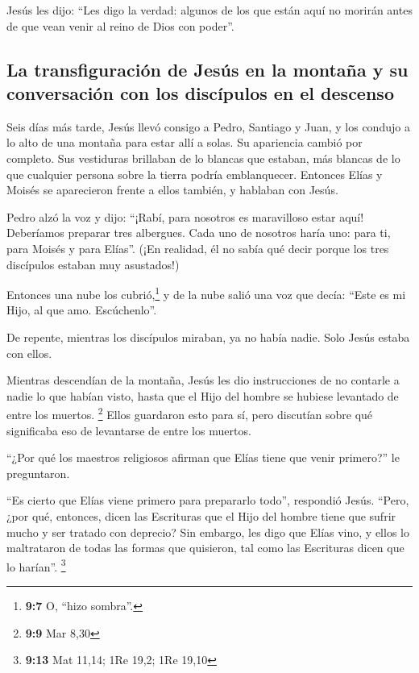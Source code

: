  Jesús les dijo: ``Les digo la verdad: algunos de los que
están aquí no morirán antes de que vean venir al reino de Dios con
poder''.

\hypertarget{la-transfiguraciuxf3n-de-jesuxfas-en-la-montauxf1a-y-su-conversaciuxf3n-con-los-discuxedpulos-en-el-descenso}{%
\subsection{La transfiguración de Jesús en la montaña y su conversación
con los discípulos en el
descenso}\label{la-transfiguraciuxf3n-de-jesuxfas-en-la-montauxf1a-y-su-conversaciuxf3n-con-los-discuxedpulos-en-el-descenso}}

 Seis días más tarde, Jesús llevó consigo a Pedro,
Santiago y Juan, y los condujo a lo alto de una montaña para estar allí
a solas. Su apariencia cambió por completo.  Sus
vestiduras brillaban de lo blancas que estaban, más blancas de lo que
cualquier persona sobre la tierra podría emblanquecer. 
Entonces Elías y Moisés se aparecieron frente a ellos también, y
hablaban con Jesús.

 Pedro alzó la voz y dijo: ``¡Rabí, para nosotros es
maravilloso estar aquí! Deberíamos preparar tres albergues. Cada uno de
nosotros haría uno: para ti, para Moisés y para Elías''. 
(¡En realidad, él no sabía qué decir porque los tres discípulos estaban
muy asustados!)

 Entonces una nube los cubrió,\footnote{\textbf{9:7} O,
  ``hizo sombra''.} y de la nube salió una voz que decía: ``Este es mi
Hijo, al que amo. Escúchenlo''.

 De repente, mientras los discípulos miraban, ya no había
nadie. Solo Jesús estaba con ellos.

 Mientras descendían de la montaña, Jesús les dio
instrucciones de no contarle a nadie lo que habían visto, hasta que el
Hijo del hombre se hubiese levantado de entre los muertos. \footnote{\textbf{9:9}
  Mar 8,30}  Ellos guardaron esto para sí, pero discutían
sobre qué significaba eso de levantarse de entre los muertos.

 ``¿Por qué los maestros religiosos afirman que Elías
tiene que venir primero?'' le preguntaron.

 ``Es cierto que Elías viene primero para prepararlo
todo'', respondió Jesús. ``Pero, ¿por qué, entonces, dicen las
Escrituras que el Hijo del hombre tiene que sufrir mucho y ser tratado
con deprecio?  Sin embargo, les digo que Elías vino, y
ellos lo maltrataron de todas las formas que quisieron, tal como las
Escrituras dicen que lo harían''. \footnote{\textbf{9:13} Mat 11,14; 1Re
  19,2; 1Re 19,10}

